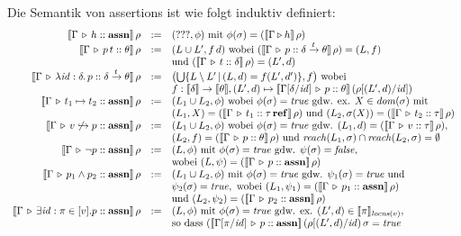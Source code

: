 \documentclass[12pt,a4paper,bigheadings]{scrartcl}
\newcommand{\semantic}[1]{\ensuremath{\llbracket#1\rrbracket}}
\newcommand{\assn}{\ensuremath{\mathbf{assn}}}
\newcommand{\locns}{\name{locns}}
\newcommand{\reach}{\name{reach}}
\newcommand{\tto}{\ensuremath{\xrightarrow{t}}}
\renewcommand{\disjoint}[2]{\ensuremath{#2\not\hookrightarrow#1}}
\begin{document}
\pagebreak[3] \noindent
Die Semantik von assertions ist wie folgt induktiv definiert:
\[\begin{array}{rcl}
  \semantic{\Tj{\Gamma}{h}{\assn}}\,\rho
  & := &
  (???, \phi) \text{ mit } \phi(\sigma) = (\semantic{\Tjh{\Gamma}{h}}\,\rho)
  \\
  \semantic{\Tj{\Gamma}{\app{p}{t}}{\theta}}\,\rho
  & := &
  (L \cup L', f\,d) \text{ wobei } (\semantic{\Tj{\Gamma}{p}{\delta \tto \theta}}\,\rho) = (L,f) \\
  && \text{und } (\semantic{\Tj{\Gamma}{t}{\delta}}\,\rho) = (L',d)
  \\
  \semantic{\Tj{\Gamma}{\abstr{\id:\delta}{p}}{\delta \tto \theta}}\,\rho
  & := &
  \bigl(\bigcup \{ L\setminus L'\,|\, (L,d) = f(L',d') \},f\bigr) \text{ wobei } \\
  && f: \semantic{\delta} \to \semantic{\theta}, (L',d) \mapsto \semantic{\Tj{\Gamma[\delta/\id]}{p}{\theta}}\,(\rho[(L',d)/\id]) 
  \\
  \semantic{\Tj{\Gamma}{t_1\mapsto t_2}{\assn}}\,\rho
  & := &
  (L_1 \cup L_2,\phi) \text{ wobei $\phi(\sigma) = \true$ gdw. ex. $X\in\dom{\sigma}$ mit} \\
  && (L_1,X) = (\semantic{\Tj{\Gamma}{t_1}{\reftype{\tau}}}\,\rho) \text{ und } (L_2,\sigma(X)) = (\semantic{\Tj{\Gamma}{t_2}{\tau}}\,\rho)
  \\
  \semantic{\Tj{\Gamma}{\disjoint{p}{v}}{\assn}}\,\rho
  & := &
  (L_1 \cup L_2,\phi) \text{ wobei $\phi(\sigma)=\true$ gdw. } (L_1,d) = (\semantic{\Tj{\Gamma}{v}{\tau}}\,\rho), \\
  && (L_2,f) = (\semantic{\Tj{\Gamma}{p}{\theta}}\,\rho) \text{ und } \reach(L_1,\sigma) \cap \reach(L_2,\sigma) = \emptyset
  \\
  \semantic{\Tj{\Gamma}{\neg p}{\assn}}\,\rho
  & := &
  (L,\phi) \text{ mit } \phi(\sigma) = \true \text{ gdw. } \psi(\sigma) = \false, \\
  && \text{wobei } (L,\psi) = (\semantic{\Tj{\Gamma}{p}{\assn}}\,\rho)
  \\
  \semantic{\Tj{\Gamma}{p_1 \wedge p_2}{\assn}}\,\rho
  & := &
  (L_1 \cup L_2, \phi) \text{ mit } \phi(\sigma) = \true \text{ gdw. } \psi_1(\sigma) = \true \text{ und} \\
  && \psi_2(\sigma) = \true, \text{ wobei } (L_1,\psi_1) = (\semantic{\Tj{\Gamma}{p_1}{\assn}}\,\rho) \\
  && \text{und } (L_2,\psi_2) = (\semantic{\Tj{\Gamma}{p_2}{\assn}}\,\rho)
  \\
  \semantic{\Tj{\Gamma}{\exists \id:\pi \in [v].p}{\assn}}\,\rho
  & := &
  (L,\phi) \text{ mit } \phi(\sigma) = \true \text{ gdw. ex. } (L',d)\in\semantic{\pi}_{\locns(v)}, \\
  && \text{so dass } (\semantic{\Tj{\Gamma[\pi/\id]}{p}{\assn}}\,(\rho[(L',d)/\id)\,\sigma = \true
\end{array}\]
\end{document}
